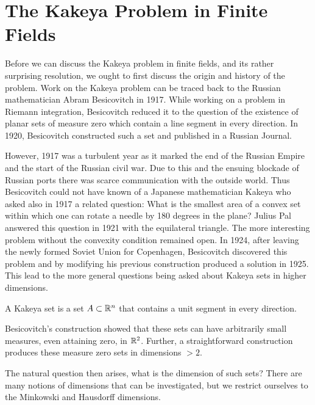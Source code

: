 \chapter{The Kakeya Problem in Finite Fields \label{chap:kakeya}}
Before we can discuss the Kakeya problem in finite fields, and its rather surprising resolution, we ought to first discuss the origin and history of the problem. 
Work on the Kakeya problem can be traced back to the Russian mathematician Abram Besicovitch in 1917. While working on a problem in Riemann integration, Besicovitch reduced it to the question
of the existence of planar sets of measure zero which contain a line segment in every direction. In 1920, Besicovitch constructed such a set and published in a Russian Journal.

However, 1917 was a turbulent year as it marked the end of
the Russian Empire and the start of the Russian civil war. Due to this and the ensuing blockade of Russian ports there was scarce communication with the outside world.
Thus Besicovitch could not have known of a Japanese mathematician Kakeya who asked also in 1917 a related question: What is the smallest area of a convex set within which
one can rotate a needle by 180 degrees in the plane? Julius Pal answered this question in 1921 with the equilateral triangle. The 
more interesting problem without the convexity condition remained open. In 1924, after leaving the newly formed Soviet Union for Copenhagen, Besicovitch discovered this
problem and by modifying his previous construction produced a solution in 1925. This lead to the more general questions being asked about Kakeya sets in higher dimensions.
\begin{definition}
    A Kakeya set is a set $A \subset \mathbb R^n$ that contains a unit segment in every direction.
\end{definition}
Besicovitch's construction showed that these sets can have arbitrarily small measures, even attaining zero, in $\mathbb R^2$. Further, a straightforward construction produces these measure zero sets in dimensions $> 2$.

The natural question then arises, what is the dimension of such sets? There are many notions of dimensions that can be investigated, but we restrict ourselves to the Minkowski and Hausdorff dimensions.

